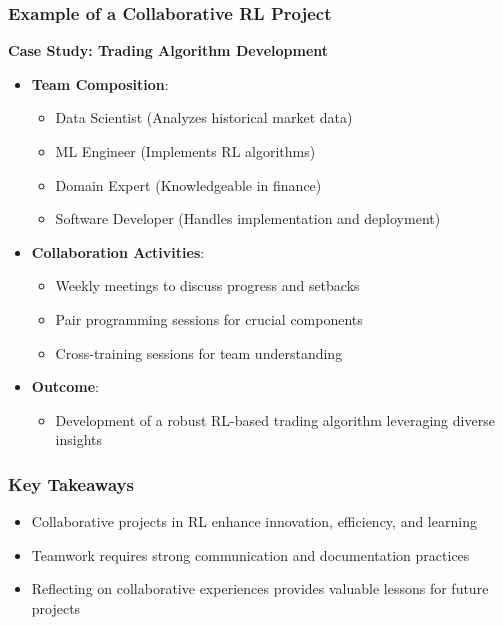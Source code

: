 \documentclass{beamer}
\begin{document}
\begin{frame}[fragile]
    \frametitle{Example of a Collaborative RL Project}
    \textbf{Case Study: Trading Algorithm Development}
    \begin{itemize}
        \item \textbf{Team Composition}:
        \begin{itemize}
            \item Data Scientist (Analyzes historical market data)
            \item ML Engineer (Implements RL algorithms)
            \item Domain Expert (Knowledgeable in finance)
            \item Software Developer (Handles implementation and deployment)
        \end{itemize}

        \item \textbf{Collaboration Activities}:
        \begin{itemize}
            \item Weekly meetings to discuss progress and setbacks
            \item Pair programming sessions for crucial components
            \item Cross-training sessions for team understanding
        \end{itemize}

        \item \textbf{Outcome}:
        \begin{itemize}
            \item Development of a robust RL-based trading algorithm leveraging diverse insights
        \end{itemize}
    \end{itemize}
\end{frame}

\begin{frame}[fragile]
    \frametitle{Key Takeaways}
    \begin{itemize}
        \item Collaborative projects in RL enhance innovation, efficiency, and learning
        \item Teamwork requires strong communication and documentation practices
        \item Reflecting on collaborative experiences provides valuable lessons for future projects
    \end{itemize}
\end{frame}
\end{document}
